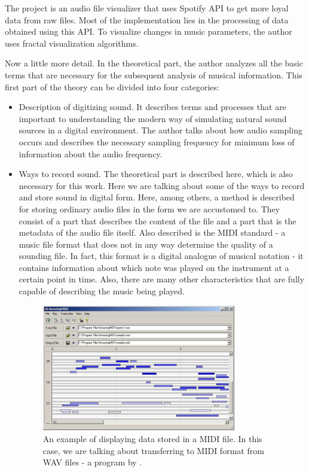 \documentclass[thesis=B,english]{FITthesis}[2019/12/23]
\begin{document}
The project is an audio file visualizer that uses Spotify API to get more loyal data from raw files. Most of the implementation lies in the processing of data obtained using this API. To visualize changes in music parameters, the author uses fractal visualization algorithms.

Now a little more detail. In the theoretical part, the author analyzes all the basic terms that are necessary for the subsequent analysis of musical information. This first part of the theory can be divided into four categories:

\begin{itemize}

\item Description of digitizing sound. It describes terms and processes that are important to understanding the modern way of simulating natural sound sources in a digital environment. The author talks about how audio sampling occurs and describes the necessary sampling frequency for minimum loss of information about the audio frequency.

\item Ways to record sound. The theoretical part is described here, which is also necessary for this work. Here we are talking about some of the ways to record and store sound in digital form. Here, among others, a method is described for storing ordinary audio files in the form we are accustomed to. They consist of a part that describes the content of the file and a part that is the metadata of the audio file itself. Also described is the MIDI standard - a music file format that does not in any way determine the quality of a sounding file. In fact, this format is a digital analogue of musical notation - it contains information about which note was played on the instrument at a certain point in time. Also, there are many other characteristics that are fully capable of describing the music being played.

\begin{figure}[ht]
            \centering
            \includegraphics[width=0.8\textwidth]{midiAmaz.jpg}
            \caption[MIDI structure]{An example of displaying data stored in a MIDI file. In this case, we are talking about transferring to MIDI format from WAV files - a program by \cite{amazingMIDI}.}
            \label{fig:samplingBasics}
\end{figure}


\end{itemize}
\end{document}
